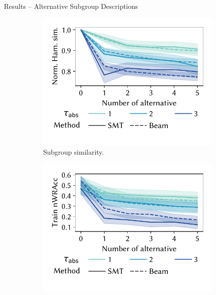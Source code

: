 \documentclass[en, navbaroff]{sdqbeamer}
\begin{document}
\begin{frame}[t]{Results -- Alternative Subgroup Descriptions}
	\begin{figure}
		\centering
		\begin{subfigure}[t]{0.4\textwidth}
			\centering
			\includegraphics[width=\textwidth, trim=10 25 10 10, clip]{plots/csd-alternatives-hamming.pdf}
			\caption{Subgroup similarity.}
			\label{fig:csd:alternatives-hamming}
		\end{subfigure}
		\hspace{\kitcolumnsep}
		\begin{subfigure}[t]{0.4\textwidth}
			\centering
			\includegraphics[width=\textwidth, trim=10 25 10 10, clip]{plots/csd-alternatives-train-nwracc.pdf}

\end{subfigure}
\end{figure}
\end{frame}
\end{document}
